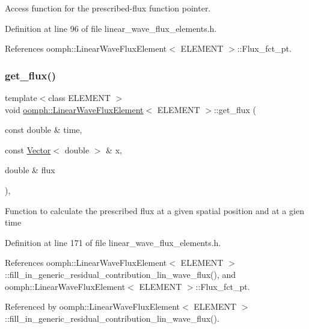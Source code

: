 Access function for the prescribed-\/flux function pointer. 



Definition at line 96 of file linear\+\_\+wave\+\_\+flux\+\_\+elements.\+h.



References oomph\+::\+Linear\+Wave\+Flux\+Element$<$ E\+L\+E\+M\+E\+N\+T $>$\+::\+Flux\+\_\+fct\+\_\+pt.

\mbox{\label{classoomph_1_1LinearWaveFluxElement_a969d93f5e289c16d581da0851fcd89e7}} 
\subsubsection{\texorpdfstring{get\+\_\+flux()}{get\_flux()}}
{\footnotesize\ttfamily template$<$class E\+L\+E\+M\+E\+NT $>$ \\
void \hyperlink{classoomph_1_1LinearWaveFluxElement}{oomph\+::\+Linear\+Wave\+Flux\+Element}$<$ E\+L\+E\+M\+E\+NT $>$\+::get\+\_\+flux (\begin{DoxyParamCaption}\item[{const double \&}]{time,  }\item[{const \hyperlink{classoomph_1_1Vector}{Vector}$<$ double $>$ \&}]{x,  }\item[{double \&}]{flux }\end{DoxyParamCaption})\hspace{0.3cm}{\ttfamily [inline]}, {\ttfamily [protected]}}

Function to calculate the prescribed flux at a given spatial position and at a gien time 

Definition at line 171 of file linear\+\_\+wave\+\_\+flux\+\_\+elements.\+h.



References oomph\+::\+Linear\+Wave\+Flux\+Element$<$ E\+L\+E\+M\+E\+N\+T $>$\+::fill\+\_\+in\+\_\+generic\+\_\+residual\+\_\+contribution\+\_\+lin\+\_\+wave\+\_\+flux(), and oomph\+::\+Linear\+Wave\+Flux\+Element$<$ E\+L\+E\+M\+E\+N\+T $>$\+::\+Flux\+\_\+fct\+\_\+pt.



Referenced by oomph\+::\+Linear\+Wave\+Flux\+Element$<$ E\+L\+E\+M\+E\+N\+T $>$\+::fill\+\_\+in\+\_\+generic\+\_\+residual\+\_\+contribution\+\_\+lin\+\_\+wave\+\_\+flux().

